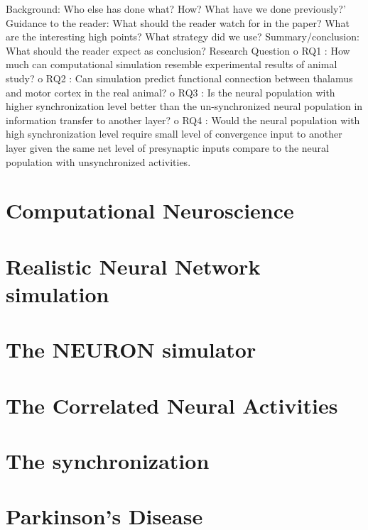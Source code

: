 Background: Who else has done what? How? What have we done previously?’
Guidance to the reader: What should the reader watch for in the paper? What are the interesting high points? What strategy did we use?
Summary/conclusion: What should the reader expect as conclusion?
Research Question
o RQ1 : How much can computational simulation resemble experimental results of animal study?
o RQ2 : Can simulation predict functional connection between thalamus and motor cortex in the real animal?
o	RQ3 : Is the neural population with higher synchronization level better than the un-synchronized neural population in information transfer to another layer? 
o	RQ4 : Would the  neural population with high synchronization level  require small level of convergence input to another layer given the same net level of presynaptic inputs compare to the neural population with unsynchronized activities.

\section{Computational Neuroscience}
\section{Realistic Neural Network simulation}

\section{The NEURON simulator}
\section{The Correlated Neural Activities}

\section{The synchronization}

\section{Parkinson's Disease}